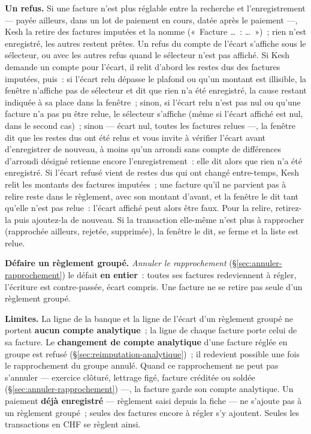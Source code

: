 \documentclass[a4paper,11pt,oneside]{article}
\begin{document}
\textbf{Un refus.} Si une facture n'est plus réglable entre la recherche et l'enregistrement --- payée ailleurs, dans un lot de paiement en cours, datée après le paiement ---, Kesh la retire des factures imputées et la nomme («~Facture \ldots~: \ldots~»)~; rien n'est enregistré, les autres restent prêtes. Un refus du compte de l'écart s'affiche sous le sélecteur, ou avec les autres refus quand le sélecteur n'est pas affiché. Si Kesh demande un compte pour l'écart, il relit d'abord les restes dus des factures imputées, puis~: si l'écart relu dépasse le plafond ou qu'un montant est illisible, la fenêtre n'affiche pas de sélecteur et dit que rien n'a été enregistré, la cause restant indiquée à sa place dans la fenêtre~; sinon, si l'écart relu n'est pas nul ou qu'une facture n'a pas pu être relue, le sélecteur s'affiche (même si l'écart affiché est nul, dans le second cas)~; sinon --- écart nul, toutes les factures relues ---, la fenêtre dit que les restes dus ont été relus et vous invite à vérifier l'écart avant d'enregistrer de nouveau, à moins qu'un arrondi sans compte de différences d'arrondi désigné retienne encore l'enregistrement~: elle dit alors que rien n'a été enregistré. Si l'écart refusé vient de restes dus qui ont changé entre-temps, Kesh relit les montants des factures imputées~; une facture qu'il ne parvient pas à relire reste dans le règlement, avec son montant d'avant, et la fenêtre le dit tant qu'elle n'est pas relue~: l'écart affiché peut alors être faux. Pour la relire, retirez-la puis ajoutez-la de nouveau. Si la transaction elle-même n'est plus à rapprocher (rapprochée ailleurs, rejetée, supprimée), la fenêtre le dit, se ferme et la liste est relue.

\textbf{Défaire un règlement groupé.} \emph{Annuler le rapprochement} (\S\ref{sec:annuler-rapprochement}) le défait \textbf{en entier}~: toutes ses factures redeviennent à régler, l'écriture est contre-passée, écart compris. Une facture ne se retire pas seule d'un règlement groupé.

\textbf{Limites.} La ligne de la banque et la ligne de l'écart d'un règlement groupé ne portent \textbf{aucun compte analytique}~; la ligne de chaque facture porte celui de sa facture. Le \textbf{changement de compte analytique} d'une facture réglée en groupe est refusé (\S\ref{sec:reimputation-analytique})~; il redevient possible une fois le rapprochement du groupe annulé. Quand ce rapprochement ne peut pas s'annuler --- exercice clôturé, lettrage figé, facture créditée ou soldée (\S\ref{sec:annuler-rapprochement}) ---, la facture garde son compte analytique. Un paiement \textbf{déjà enregistré} --- règlement saisi depuis la fiche --- ne s'ajoute pas à un règlement groupé~; seules des factures encore à régler s'y ajoutent. Seules les transactions en CHF se règlent ainsi.
\end{document}
